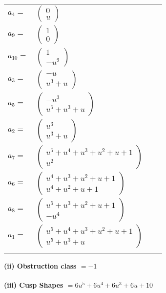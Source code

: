 \documentclass[1p]{elsarticle_modified}
\theoremstyle{definition}
\begin{document}
\begin{tabular}{m{7pt} m{180pt} m{7pt} m{180pt} }
\flushright $a_{4}=$&$\begin{pmatrix}0\\u\end{pmatrix}$ \\
\flushright $a_{9}=$&$\begin{pmatrix}1\\0\end{pmatrix}$ \\
\flushright $a_{10}=$&$\begin{pmatrix}1\\- u^2\end{pmatrix}$ \\
\flushright $a_{3}=$&$\begin{pmatrix}- u\\u^3+u\end{pmatrix}$ \\
\flushright $a_{5}=$&$\begin{pmatrix}- u^3\\u^5+u^3+u\end{pmatrix}$ \\
\flushright $a_{2}=$&$\begin{pmatrix}u^3\\u^3+u\end{pmatrix}$ \\
\flushright $a_{7}=$&$\begin{pmatrix}u^5+u^4+u^3+u^2+u+1\\u^2\end{pmatrix}$ \\
\flushright $a_{6}=$&$\begin{pmatrix}u^4+u^3+u^2+u+1\\u^4+u^2+u+1\end{pmatrix}$ \\
\flushright $a_{8}=$&$\begin{pmatrix}u^5+u^3+u^2+u+1\\- u^4\end{pmatrix}$ \\
\flushright $a_{1}=$&$\begin{pmatrix}u^5+u^4+u^3+u^2+u+1\\u^5+u^3+u\end{pmatrix}$\\&\end{tabular}
\flushleft \textbf{(ii) Obstruction class $= -1$}\\~\\
\flushleft \textbf{(iii) Cusp Shapes $= 6 u^5+6 u^4+6 u^3+6 u+10$}\\~\\
\end{document}
